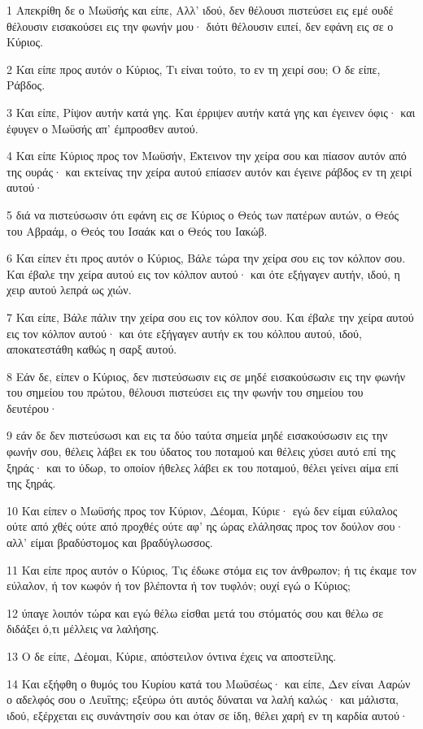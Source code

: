 \par 1 Απεκρίθη δε ο Μωϋσής και είπε, Αλλ' ιδού, δεν θέλουσι πιστεύσει εις εμέ ουδέ θέλουσιν εισακούσει εις την φωνήν μου· διότι θέλουσιν ειπεί, δεν εφάνη εις σε ο Κύριος.
\par 2 Και είπε προς αυτόν ο Κύριος, Τι είναι τούτο, το εν τη χειρί σου; Ο δε είπε, Ράβδος.
\par 3 Και είπε, Ρίψον αυτήν κατά γης. Και έρριψεν αυτήν κατά γης και έγεινεν όφις· και έφυγεν ο Μωϋσής απ' έμπροσθεν αυτού.
\par 4 Και είπε Κύριος προς τον Μωϋσήν, Έκτεινον την χείρα σου και πίασον αυτόν από της ουράς· και εκτείνας την χείρα αυτού επίασεν αυτόν και έγεινε ράβδος εν τη χειρί αυτού·
\par 5 διά να πιστεύσωσιν ότι εφάνη εις σε Κύριος ο Θεός των πατέρων αυτών, ο Θεός του Αβραάμ, ο Θεός του Ισαάκ και ο Θεός του Ιακώβ.
\par 6 Και είπεν έτι προς αυτόν ο Κύριος, Βάλε τώρα την χείρα σου εις τον κόλπον σου. Και έβαλε την χείρα αυτού εις τον κόλπον αυτού· και ότε εξήγαγεν αυτήν, ιδού, η χειρ αυτού λεπρά ως χιών.
\par 7 Και είπε, Βάλε πάλιν την χείρα σου εις τον κόλπον σου. Και έβαλε την χείρα αυτού εις τον κόλπον αυτού· και ότε εξήγαγεν αυτήν εκ του κόλπου αυτού, ιδού, αποκατεστάθη καθώς η σαρξ αυτού.
\par 8 Εάν δε, είπεν ο Κύριος, δεν πιστεύσωσιν εις σε μηδέ εισακούσωσιν εις την φωνήν του σημείου του πρώτου, θέλουσι πιστεύσει εις την φωνήν του σημείου του δευτέρου·
\par 9 εάν δε δεν πιστεύσωσι και εις τα δύο ταύτα σημεία μηδέ εισακούσωσιν εις την φωνήν σου, θέλεις λάβει εκ του ύδατος του ποταμού και θέλεις χύσει αυτό επί της ξηράς· και το ύδωρ, το οποίον ήθελες λάβει εκ του ποταμού, θέλει γείνει αίμα επί της ξηράς.
\par 10 Και είπεν ο Μωϋσής προς τον Κύριον, Δέομαι, Κύριε· εγώ δεν είμαι εύλαλος ούτε από χθές ούτε από προχθές ούτε αφ' ης ώρας ελάλησας προς τον δούλον σου· αλλ' είμαι βραδύστομος και βραδύγλωσσος.
\par 11 Και είπε προς αυτόν ο Κύριος, Τις έδωκε στόμα εις τον άνθρωπον; ή τις έκαμε τον εύλαλον, ή τον κωφόν ή τον βλέποντα ή τον τυφλόν; ουχί εγώ ο Κύριος;
\par 12 ύπαγε λοιπόν τώρα και εγώ θέλω είσθαι μετά του στόματός σου και θέλω σε διδάξει ό,τι μέλλεις να λαλήσης.
\par 13 Ο δε είπε, Δέομαι, Κύριε, απόστειλον όντινα έχεις να αποστείλης.
\par 14 Και εξήφθη ο θυμός του Κυρίου κατά του Μωϋσέως· και είπε, Δεν είναι Ααρών ο αδελφός σου ο Λευΐτης; εξεύρω ότι αυτός δύναται να λαλή καλώς· και μάλιστα, ιδού, εξέρχεται εις συνάντησίν σου και όταν σε ίδη, θέλει χαρή εν τη καρδία αυτού·
